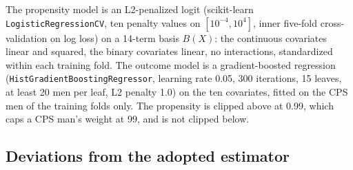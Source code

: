 \documentclass[11pt]{article}
\newcommand{\var}[1]{\texttt{#1}}
\begin{document}
The propensity model is an L2-penalized logit (scikit-learn \var{LogisticRegressionCV}, ten
penalty values on $[10^{-4}, 10^{4}]$, inner five-fold cross-validation on log loss) on a
14-term basis $B(X)$: the continuous covariates linear and squared, the binary covariates
linear, no interactions, standardized within each training fold. The outcome model is a
gradient-boosted regression (\var{HistGradientBoostingRegressor}, learning rate 0.05, 300
iterations, 15 leaves, at least 20 men per leaf, L2 penalty 1.0) on the ten covariates,
fitted on the CPS men of the training folds only. The propensity is clipped above at 0.99,
which caps a CPS man's weight at 99, and is not clipped below.

\subsection{Deviations from the adopted estimator}
\label{sec:devs}
\end{document}

